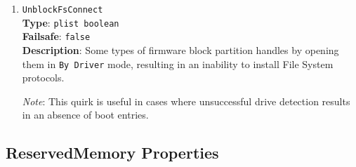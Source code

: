 \documentclass[]{article}
\begin{document}
\begin{enumerate}
  This is an experimental quirk, which should only be used for the aforementioned problem.
  In all other cases, the quirk may render the operating system unstable and is not recommended.
  The recommended solution in the other cases is to install a kernel extension such as
  \href{https://github.com/RehabMan/VoodooTSCSync}{VoodooTSCSync},
  \href{https://github.com/interferenc/TSCAdjustReset}{TSCAdjustReset},
  or \href{https://github.com/lvs1974/CpuTscSync}{CpuTscSync} (a more specialised
  variant of VoodooTSCSync for newer laptops).

  \emph{Note}: This quirk cannot replace the kernel extension because it cannot operate in
  ACPI S3 (sleep wake) mode and because the UEFI firmware only provides very limited
  multicore support which prevents precise updates of the MSR registers.

\item
  \texttt{UnblockFsConnect}\\
  \textbf{Type}: \texttt{plist\ boolean}\\
  \textbf{Failsafe}: \texttt{false}\\
  \textbf{Description}: Some types of firmware block partition handles by opening them
  in \texttt{By\ Driver} mode, resulting in an inability to install File System protocols.

  \emph{Note}: This quirk is useful in cases where unsuccessful drive detection
  results in an absence of boot entries.

\end{enumerate}

\subsection{ReservedMemory Properties}\label{uefirsvdprops}
\end{document}
